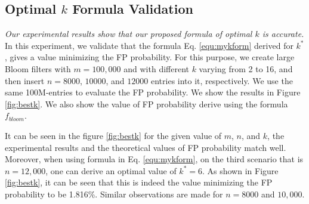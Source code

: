 \presub
\subsection{Optimal $k$ Formula Validation} \postsub


\textit{Our experimental results show that our proposed formula of optimal $k$ is accurate.}
In this experiment, we validate that the formula Eq. \ref{equ:mykform} derived for $k^*$, gives a value minimizing the FP probability. For this purpose, we create large Bloom filters with $m=100,000$ and with different $k$ varying from 2 to 16,  and then insert $n=8000$, $10000$, and $12000$ entries into it, respectively. We use the same 100M-entries to evaluate the FP probability. We show the results in Figure \ref{fig:bestk}. We also show the value of FP probability derive using the formula $f_{bloom}$.


It can be seen in the figure \ref{fig:bestk} for the given value of $m$, $n$, and $k$, the experimental results and the theoretical values of FP probability match well. Moreover, when using formula in Eq. \ref{equ:mykform}, on the third scenario that is $n=12,000$, one can derive an optimal value of $k^*=6$. As shown in Figure \ref{fig:bestk}, it can be seen that this is indeed the value minimizing the FP probability to be 1.816\%. Similar observations are made for $n=8000$ and $10,000$.



